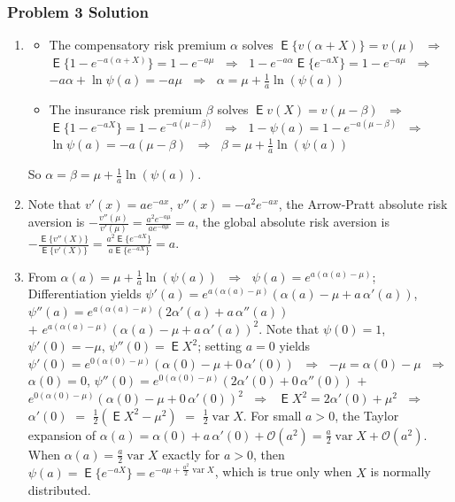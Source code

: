 \documentclass[10pt,handout]{beamer}
\newcommand{\ds}{\displaystyle}
\newcommand{\ie}{\;\Longrightarrow\;}
\DeclareMathOperator\expc{\mathsf{E}}
\DeclareMathOperator\var{var}
\theoremstyle{definition}
\begin{document}
\begin{frame}[allowframebreaks]
  \frametitle{Problem 3 Solution}
  \begin{enumerate}
    \item 
      \begin{itemize}
        \item The compensatory risk premium $\alpha$ solves $\expc\big\{v(\alpha + X)\big\} = v(\mu)$ $\ie$ $\expc\big\{1 - e^{-a(\alpha + X)}\big\} = 1 - e^{-a\mu}$ $\ie$ $1 - e^{-a\alpha}\expc\big\{e^{-aX}\big\} = 1 - e^{-a\mu}$ $\ie$ $-a\alpha + \ln\psi(a) = -a\mu$ $\ie$ $\ds\alpha = \mu + \frac{1}{a}\ln(\psi(a))$
        \item The insurance risk premium $\beta$ solves $\expc{v(X)} = v(\mu - \beta)$ $\ie$ $\expc\big\{1 - e^{-a X}\big\} = 1 - e^{-a(\mu - \beta)}$ $\ie$ $1 - \psi(a) = 1 - e^{-a(\mu - \beta)}$ $\ie$ $\ln\psi(a) = -a(\mu - \beta)$ $\ie$ $\ds\beta = \mu + \frac{1}{a}\ln(\psi(a))$
      \end{itemize}
      So $\ds\alpha = \beta = \mu + \frac{1}{a}\ln(\psi(a))$.
    \item Note that $\ds v'(x) = ae^{-ax}$, $\ds v''(x) = -a^2e^{-ax}$, the Arrow-Pratt absolute risk aversion is $\ds -\frac{v''(\mu)}{v'(\mu)} = \frac{a^2e^{-a\mu}}{ae^{-a\mu}} = a$, the global absolute risk aversion is $\ds -\frac{\expc\big\{v''(X)\big\}}{\expc\big\{v'(X)\big\}} = \frac{a^2\expc\big\{e^{-a X}\big\}}{a\expc\big\{e^{-a X}\big\}} = a$.
    \item From $\ds\alpha(a) = \mu + \frac{1}{a}\ln(\psi(a))$ $\ie$ $\ds\psi(a) = e^{a(\alpha(a) - \mu)}$; Differentiation yields $\ds\psi'(a) = e^{a(\alpha(a) - \mu)}(\alpha(a) - \mu + a\,\alpha'(a))$, $\ds\psi''(a) = e^{a(\alpha(a) - \mu)}(2\alpha'(a) + a\,\alpha''(a))$ \\ $+$ $\ds e^{a(\alpha(a) - \mu)}(\alpha(a) - \mu + a\,\alpha'(a))^2$. Note that $\ds\psi(0) = 1$, $\ds\psi'(0) = -\mu$, $\ds\psi''(0) = \expc{X^2}$; setting $a = 0$ yields $\ds\psi'(0) = e^{0(\alpha(0) - \mu)}(\alpha(0) - \mu + 0\,\alpha'(0))$ $\ie$ $\ds-\mu = \alpha(0) - \mu$ $\ie$ $\ds\alpha(0) = 0$, $\ds\psi''(0) = e^{0(\alpha(0) - \mu)}(2\alpha'(0) + 0\,\alpha''(0))$ $+$ $\ds e^{0(\alpha(0) - \mu)}(\alpha(0) - \mu + 0\,\alpha'(0))^2$ $\ie$ $\ds\expc{X^2} = 2\alpha'(0) + \mu^2$ $\ie$ $\ds\alpha'(0)$ $=$ $\ds\frac{1}{2}(\expc{X^2} - \mu^2)$ $=$ $\ds\frac{1}{2}\var{X}$. For small $a > 0$, the Taylor expansion of $\ds\alpha(a) = \alpha(0) + a\,\alpha'(0) + \mathcal{O}(a^2) = \frac{a}{2}\var{X} + \mathcal{O}(a^2)$. When $\ds\alpha(a) = \frac{a}{2}\var{X}$ exactly for $a > 0$, then $\ds\psi(a) = \expc\big\{e^{-aX}\big\} = e^{-a\mu + \frac{a^2}{2}\var{X}}$, which is true only when $X$ is normally distributed.

\end{enumerate}
\end{frame}
\end{document}
